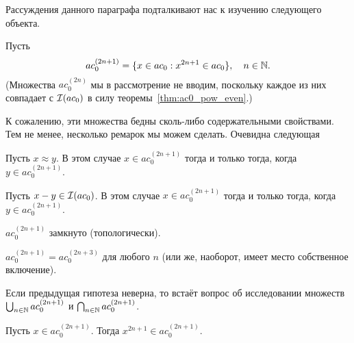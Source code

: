 Рассуждения данного параграфа подталкивают нас к изучению следующего объекта.

Пусть
\begin{equation}
	ac_0^{(2n+1)} = \{ x\in ac_0 : x^{2n+1} \in ac_0\}, \quad n\in\mathbb{N}
	.
\end{equation}
(Множества $ac_0^{(2n)}$ мы в рассмотрение не вводим, поскольку каждое из них совпадает с $\mathcal{I}(ac_0)$ в силу теоремы~\ref{thm:ac0_pow_even}.)

К сожалению, эти множества бедны сколь-либо содержательными свойствами.
Тем не менее, несколько ремарок мы можем сделать.
Очевидна следующая
\begin{lemma}
	Пусть $x \approx y$.
	В этом случае $x \in ac_0^{(2n+1)}$ тогда и только тогда, когда $y \in ac_0^{(2n+1)}$.
\end{lemma}

\begin{lemma}
	Пусть $x - y \in \mathcal{I}(ac_0)$.
	В этом случае $x \in ac_0^{(2n+1)}$ тогда и только тогда, когда $y \in ac_0^{(2n+1)}$.
\end{lemma}




\begin{hypothesis}
	$ac_0^{(2n+1)}$ замкнуто (топологически).
\end{hypothesis}

\begin{hypothesis}
	$ac_0^{(2n+1)} = ac_0^{(2n+3)}$ для любого $n$ (или же, наоборот, имеет место собственное включение).
\end{hypothesis}

\begin{hypothesis}
	Если предыдущая гипотеза неверна, то встаёт вопрос об исследовании множеств
	$\bigcup_{n\in\mathbb{N}}ac_0^{(2n+1)}$ и 	$\bigcap_{n\in\mathbb{N}}ac_0^{(2n+1)}$.
\end{hypothesis}

\begin{hypothesis}
	Пусть $x\in ac_0^{(2n+1)}$.
	Тогда $x^{2n+1} \in ac_0^{(2n+1)}$.
\end{hypothesis}

